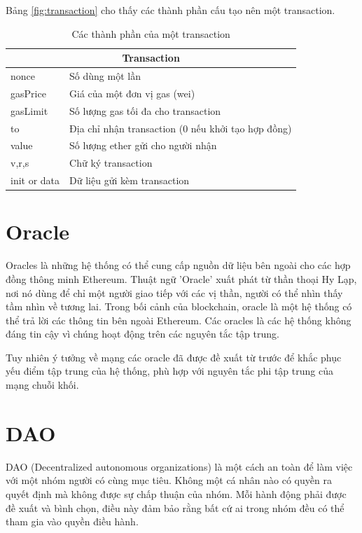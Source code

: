\documentclass[../main.tex]{subfiles}
\begin{document}
Bảng \ref{fig:transaction} cho thấy các thành phần cấu tạo nên một transaction.
\begin{table}[h!]
    \centering
    \begin{tabular}{||l l||}
    \hline
    \multicolumn{2}{c}{Transaction}  \\
    \hline \hline
    nonce       & Số dùng một lần\\
    gasPrice    & Giá của một đơn vị gas (wei)\\
    gasLimit    & Số lượng gas tối đa cho transaction\\
    to          & Địa chỉ nhận transaction (0 nếu khởi tạo hợp đồng)\\
    value       & Số lượng ether gửi cho người nhận\\
    v,r,s       & Chữ ký transaction\\
    init or data& Dữ liệu gửi kèm transaction\\
    \hline
    \end{tabular}
    \caption{Các thành phần của một transaction}
    \label{table:transaction}
\end{table}
\section{Oracle}
Oracles là những hệ thống có thể cung cấp nguồn dữ liệu bên ngoài cho các hợp đồng thông minh Ethereum. Thuật ngữ 'Oracle' xuất phát từ thần thoại Hy Lạp, nơi nó dùng để chỉ một người giao tiếp với các vị thần, người có thể nhìn thấy tầm nhìn về tương lai. Trong bối cảnh của blockchain, oracle là một hệ thống có thể trả lời các thông tin bên ngoài Ethereum. Các oracles là các hệ thống không đáng tin cậy vì chúng hoạt động trên các nguyên tắc tập trung.

Tuy nhiên ý tưởng về mạng các oracle đã được đề xuất từ trước để khắc phục yếu điểm tập trung của hệ thống, phù hợp với nguyên tắc phi tập trung của mạng chuỗi khối.
\section{DAO}
DAO (Decentralized autonomous organizations) là một cách an toàn để làm việc với một nhóm người có cùng mục tiêu. Không một cá nhân nào có quyền ra quyết định mà không được sự chấp thuận của nhóm. Mỗi hành động phải được đề xuất và bình chọn, điều này đảm bảo rằng bất cứ ai trong nhóm đều có thể tham gia vào quyền điều hành.
\end{document}
